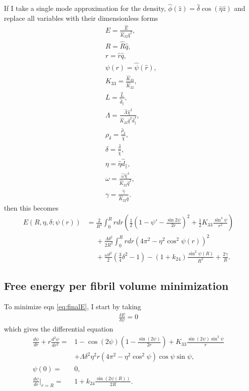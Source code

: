 \documentclass[12pt]{article}
\begin{document}
If I take a single mode approximation for the density, $\hat{\phi}(\hat{z})=\hat{\delta}\cos(\hat{\eta}\hat{z})$ and replace all variables with their dimensionless forms
\begin{align}
&E=\frac{\hat{E}}{\hat{K}_{22}\hat{q}^2},\\
&R=\hat{R}\hat{q},\\
&r=\hat{r}\hat{q},\\
&\psi(r)=\hat{\psi}(\hat{r}),\\
&K_{33}=\frac{\hat{K}_{33}}{\hat{K}_{22}},\\
&L=\frac{\hat{L}}{\hat{d}_{\parallel}},\\
&\Lambda=\frac{\hat{\Lambda}\hat{\chi}^2}{\hat{K}_{22}\hat{q}^2\hat{d}_{\parallel}^4},\label{eq:dimensionlessLambda}\\
&\rho_{\delta}=\frac{\hat{\rho}_{\delta}}{\hat{\chi}},\\
&\delta=\frac{\hat{\delta}}{\hat{\chi}},\\
&\eta=\hat{\eta}\hat{d}_{\parallel},\\
&\omega=\frac{\hat{\omega}\hat{\chi}^4}{\hat{K}_{22}\hat{q}^2},\label{eq:dimensionlessomega}\\
&\gamma=\frac{\hat{\gamma}}{\hat{K}_{22}\hat{q}}.
\end{align}
then this becomes
\begin{align}\label{eq:finalE}
E(R,\eta,\delta;\psi(r))&=\frac{2}{R^2}\int_0^{R}rdr\left(\frac{1}{2}\left(1-\psi'-\frac{\sin2\psi}{2r}\right)^2+\frac{1}{2}K_{33}\frac{\sin^4\psi}{r^2}\right)\nonumber\\
&\phantom{=}+\frac{\Lambda\delta^2}{2R^2}\int_0^Rrdr\left(4\pi^2-\eta^2\cos^2\psi(r)\right)^2\nonumber\\
&\phantom{=}+\frac{\omega\delta^2}{2}\left(\frac{3}{4}\delta^2-1\right)-(1+k_{24})\frac{\sin^2\psi(R)}{R^2}+\frac{2\gamma}{R}.
\end{align}

\subsection{Free energy per fibril volume minimization}
To minimize eqn \ref{eq:finalE}, I start by taking
\begin{align}
\frac{\delta E}{\delta \psi}=0
\end{align}
which gives the differential equation
\begin{subequations}
\begin{align}\label{eq:psiODE}
\frac{d\psi}{dr}+r\frac{d^2\psi}{dr^2}=&1-\cos(2\psi)\left(1-\frac{\sin(2\psi)}{2r}\right)+K_{33}\frac{\sin(2\psi)\sin^2\psi}{r}\nonumber\\
&+\Lambda\delta^2\eta^2r(4\pi^2-\eta^2\cos^2\psi)\cos\psi\sin\psi,\\
\psi(0)=&0,\label{eq:psiBC0}\\
\frac{d\psi}{dr}\bigg|_{r=R}=&1+k_{24}\frac{\sin(2\psi(R))}{2R}.\label{eq:psiBCR}
\end{align}
\end{subequations}
\end{document}
